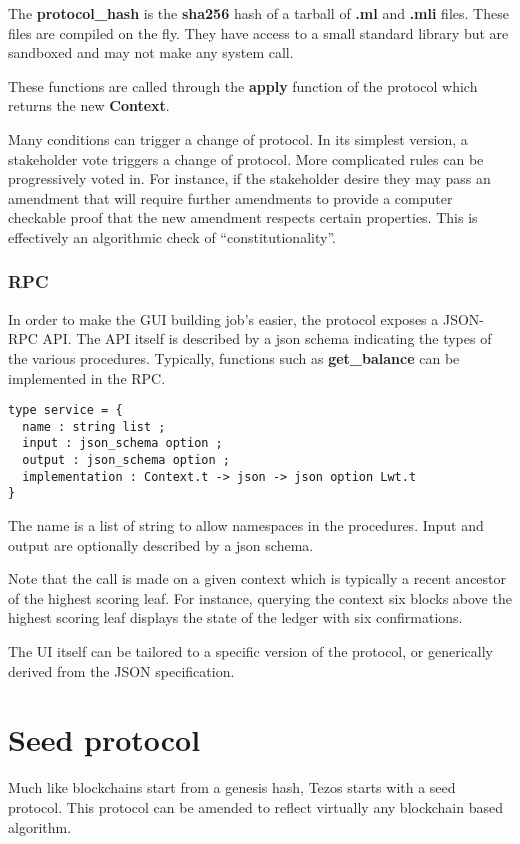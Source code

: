 \documentclass[letterpaper]{article}
\begin{document}
The \textbf{protocol\_hash} is the \textbf{sha256} hash of a tarball of
\textbf{.ml} and \textbf{.mli} files. These files are compiled on the
fly. They have access to a small standard library but are sandboxed
and may not make any system call.

These functions are called through the \textbf{apply} function of the protocol
which returns the new \textbf{Context}.

Many conditions can trigger a change of protocol. In its simplest version,
a stakeholder vote triggers a change of protocol. More complicated rules
can be progressively voted in. For instance, if the stakeholder desire they
may pass an amendment that will require further amendments to provide a
computer checkable proof that the new amendment respects certain properties.
This is effectively an algorithmic check of ``constitutionality''.

\subsubsection{RPC}
In order to make the GUI building job's easier, the protocol exposes a JSON-RPC
API. The API itself is described by a json schema indicating the types of the
various procedures. Typically, functions such as \textbf{get\_balance} can
be implemented in the RPC.

\begin{lstlisting}
type service = {
  name : string list ;
  input : json_schema option ;
  output : json_schema option ;
  implementation : Context.t -> json -> json option Lwt.t
}
\end{lstlisting}

The name is a list of string to allow namespaces in the procedures. Input and
output are optionally described by a json schema.

Note that the call is made on a given context which is typically a recent ancestor
of the highest scoring leaf. For instance, querying the context six blocks above
the highest scoring leaf displays the state of the ledger with six confirmations.

The UI itself can be tailored to a specific version of the protocol, or generically
derived from the JSON specification.

\section{Seed protocol}
Much like blockchains start from a genesis hash, Tezos starts with a seed
protocol. This protocol can be amended to reflect virtually any blockchain based
algorithm.
\end{document}
